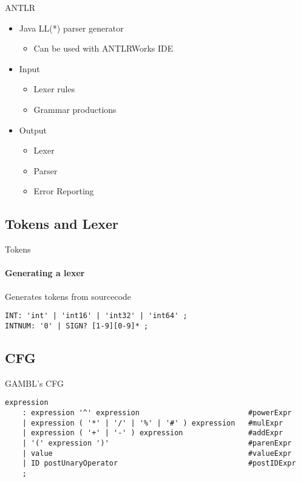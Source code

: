 \begin{frame}{ANTLR}
 \begin{itemize}
    \item Java LL(*) parser generator
    \begin{itemize}
      \item Can be used with ANTLRWorks IDE
    \end{itemize}
    \item Input
    \begin{itemize}
      \item Lexer rules
      \item Grammar productions
    \end{itemize}
    \item Output
    \begin{itemize}
      \item Lexer
      \item Parser
      \item Error Reporting
    \end{itemize}
  \end{itemize}
\end{frame}


\subsection{Tokens and Lexer}
\begin{frame}[fragile]{Tokens}
\framesubtitle{Generating a lexer}
 Generates tokens from sourcecode

\begin{lstlisting}[caption=Example af lexer rules in GAMBL.,frame=tlrb, basicstyle=\tiny, numbers=none]
INT: 'int' | 'int16' | 'int32' | 'int64' ;
INTNUM: '0' | SIGN? [1-9][0-9]* ;
\end{lstlisting}
\end{frame}


\subsection{CFG}
\begin{frame}[fragile]{GAMBL's CFG}
 \begin{lstlisting}[caption=Grammar rules for the expression production in GAMBL.,frame=tlrb, basicstyle=\tiny, numbers=none]
expression
    : expression '^' expression                         #powerExpr
    | expression ( '*' | '/' | '%' | '#' ) expression   #mulExpr
    | expression ( '+' | '-' ) expression               #addExpr
    | '(' expression ')'                                #parenExpr
    | value                                             #valueExpr
    | ID postUnaryOperator                              #postIDExpr
    ;
\end{lstlisting}
\end{frame}



